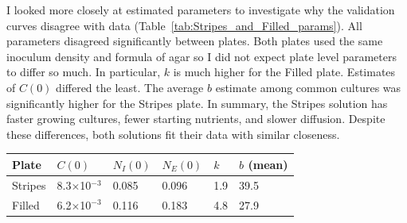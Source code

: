 \begin{multicols}{2}

I looked more closely at estimated parameters to investigate why the
validation curves disagree with data
(Table~\ref{tab:Stripes_and_Filled_params}). All parameters disagreed
significantly between plates. Both plates used the same inoculum
density and formula of agar so I did not expect plate level parameters
to differ so much. In particular, \(k\) is much higher for the Filled
plate. Estimates of \(C(0)\) differed the least. The average \(b\)
estimate among common cultures was significantly higher for the
Stripes plate. In summary, the Stripes solution has faster growing
cultures, fewer starting nutrients, and slower diffusion.
Despite these differences, both solutions fit their data with similar
closeness.
\begin{center}
  \begin{tabular}{l l l l l l}
    \hline
    Plate     & \(C(0)\)                   & \(N_{I}(0)\) & \(N_{E}(0)\) & \(k\) & \(b\) (mean)\\
    \hline
    Stripes   & 8.3\(\times\)10\(^{-3}\)   & 0.085      & 0.096       & 1.9  & 39.5\\
    Filled    & 6.2\(\times\)10\(^{-3}\)   & 0.116      & 0.183       & 4.8  & 27.9\\
    \hline
  \end{tabular}
  \label{tab:Stripes_and_Filled_params}
\end{center}


\end{multicols}
